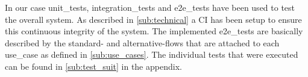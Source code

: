 In our case \glspl{unit_test}, \glspl{integration_test} and \glspl{e2e_test} have been used to test the overall system. As described in \autoref{sub:technical} a \gls{CI} has been setup to ensure this continuous integrity of the system. The implemented \glspl{e2e_test} are basically described by the standard- and alternative-flows that are attached to each \gls{use_case} as defined in \autoref{sub:use_cases}. The individual tests that were executed can be found in \autoref{sub:test_suit} in the appendix.


